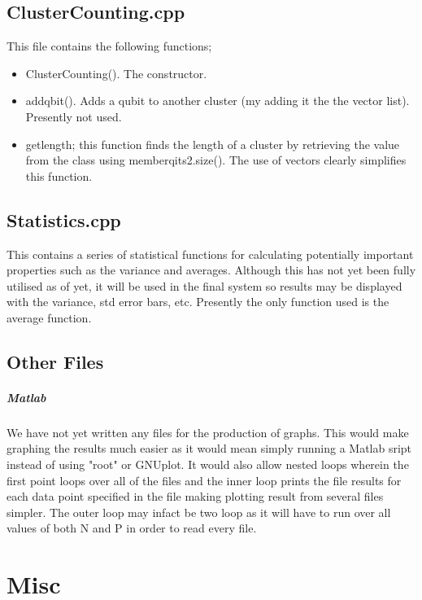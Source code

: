 \documentclass{article}
\numberwithin{equation}{section} %
\begin{document}
\subsection{ClusterCounting.cpp} This file contains the following functions;
\begin{itemize}

\item ClusterCounting(). The constructor.

\item add\textunderscore qbit(). Adds a qubit to another cluster (my adding it the the vector list). Presently not used.

\item get\textunderscore length; this function finds the length of a cluster by retrieving the value from the class using memberqits2.size(). The use of vectors clearly simplifies this function.

\end{itemize}



\subsection{Statistics.cpp}
This contains a series of statistical functions for calculating potentially important properties such as the variance and averages. Although this has not yet been fully utilised as of yet, it will be used in the final system so results may be displayed with the variance, std error bars, etc. Presently the only function used is the average function. 

\subsection{Other Files}

\subparagraph{Matlab}  We have not yet written any files for the production of graphs.  This would make graphing the results much easier as it would mean simply running a Matlab sript instead of using "root" or GNUplot. It would also allow nested loops wherein the first point loops over all of the files and the inner loop prints the file results for each data point specified in the file making plotting result from several files simpler. The outer loop may infact be two loop as it will have to run over all values of both N and P in order to read every file.

 
\section{Misc}
\end{document}
